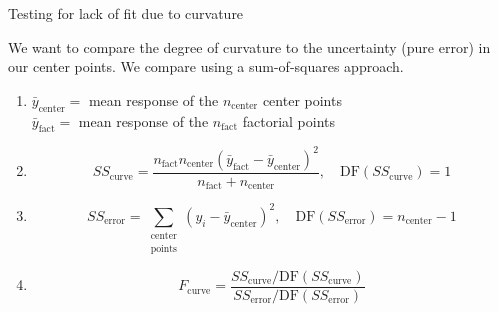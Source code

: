\documentclass[10pt]{beamer}\usepackage[]{graphicx}\usepackage[]{color}
\begin{document}
\begin{frame}{Testing for lack of fit due to curvature}

We want to compare the degree of curvature to the uncertainty (pure error) in our center points. We compare using a sum-of-squares approach.

\begin{enumerate}
  \item<2-> $\bar{y}_\text{center} = $ mean response of the $n_\text{center}$ center points\\ 
      $\bar{y}_\text{fact} = $ mean response of the $n_\text{fact}$ factorial points
  \item<3-> \[ SS_\text{curve} = \frac{n_\text{fact}n_\text{center}(\bar{y}_\text{fact} - \bar{y}_\text{center})^2}{n_\text{fact} + n_\text{center}},\quad \text{DF}(SS_\text{curve}) = 1 \]
  \item<4-> \[ SS_\text{error} = \sum_{\substack{\text{center} \\ \text{points}}} (y_i - \bar{y}_\text{center})^2,\quad \text{DF}(SS_\text{error}) = n_\text{center} - 1 \]
  \item<5-> \[ F_\text{curve} = \frac{SS_\text{curve}/\text{DF}(SS_\text{curve})}{SS_\text{error}/\text{DF}(SS_\text{error})} \]
\end{enumerate}

\end{frame}
\end{document}
